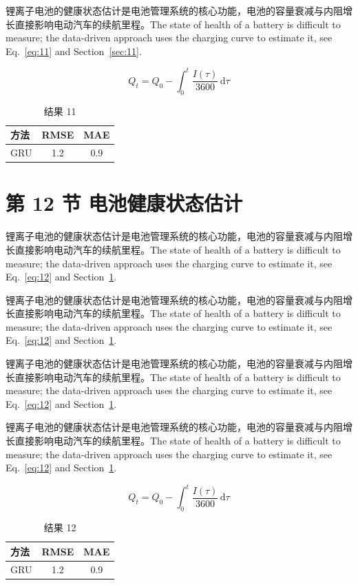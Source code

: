 \documentclass[UTF8,fontset=mac]{ctexart}
\begin{document}
锂离子电池的健康状态估计是电池管理系统的核心功能，电池的容量衰减与内阻增长直接影响电动汽车的续航里程\cite{a2020}。The state of health of a battery is difficult to measure; the data-driven approach uses the charging curve to estimate it, see Eq.~\eqref{eq:11} and Section~\ref{sec:11}.

\begin{equation}\label{eq:11}
  Q_t = Q_0 - \int_0^t \frac{I(\tau)}{3600}\,\mathrm{d}\tau
\end{equation}
\begin{table}[h]\centering\begin{tabular}{lcc}\toprule 方法 & RMSE & MAE\\\midrule GRU & 1.2 & 0.9\\\bottomrule\end{tabular}\caption{结果 11}\end{table}

\section{第 12 节 电池健康状态估计}\label{sec:12}
锂离子电池的健康状态估计是电池管理系统的核心功能，电池的容量衰减与内阻增长直接影响电动汽车的续航里程\cite{a2020}。The state of health of a battery is difficult to measure; the data-driven approach uses the charging curve to estimate it, see Eq.~\eqref{eq:12} and Section~\ref{sec:12}.

锂离子电池的健康状态估计是电池管理系统的核心功能，电池的容量衰减与内阻增长直接影响电动汽车的续航里程\cite{a2020}。The state of health of a battery is difficult to measure; the data-driven approach uses the charging curve to estimate it, see Eq.~\eqref{eq:12} and Section~\ref{sec:12}.

锂离子电池的健康状态估计是电池管理系统的核心功能，电池的容量衰减与内阻增长直接影响电动汽车的续航里程\cite{a2020}。The state of health of a battery is difficult to measure; the data-driven approach uses the charging curve to estimate it, see Eq.~\eqref{eq:12} and Section~\ref{sec:12}.

锂离子电池的健康状态估计是电池管理系统的核心功能，电池的容量衰减与内阻增长直接影响电动汽车的续航里程\cite{a2020}。The state of health of a battery is difficult to measure; the data-driven approach uses the charging curve to estimate it, see Eq.~\eqref{eq:12} and Section~\ref{sec:12}.

\begin{equation}\label{eq:12}
  Q_t = Q_0 - \int_0^t \frac{I(\tau)}{3600}\,\mathrm{d}\tau
\end{equation}
\begin{table}[h]\centering\begin{tabular}{lcc}\toprule 方法 & RMSE & MAE\\\midrule GRU & 1.2 & 0.9\\\bottomrule\end{tabular}\caption{结果 12}\end{table}
\end{document}
